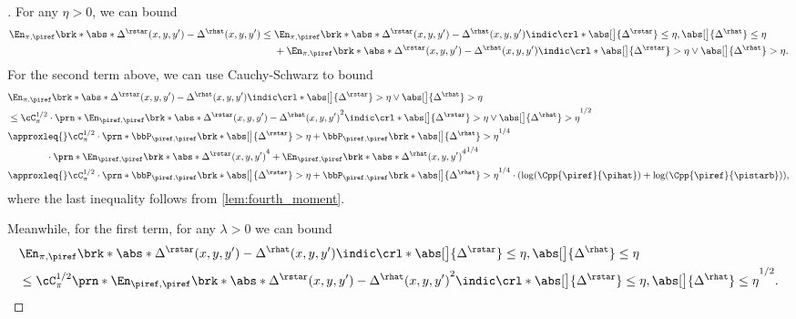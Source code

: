                \begin{proof}[]
          For any $\eta>0$, we can bound
          \begin{align}
            \En_{\pi,\piref}\brk*{\abs*{\Delta^{\rstar}(x,y,y') -
            \Delta^{\rhat}(x,y,y')}}
            &\leq{}             \En_{\pi,\piref}\brk*{\abs*{\Delta^{\rstar}(x,y,y') -
            \Delta^{\rhat}(x,y,y')}\indic\crl*{\abs[\big]{\Delta^{\rstar}}\leq\eta,
              \abs[\big]{\Delta^{\rhat}}\leq\eta}}\\
            &~~~~+  \En_{\pi,\piref}\brk*{\abs*{\Delta^{\rstar}(x,y,y') -
            \Delta^{\rhat}(x,y,y')}\indic\crl*{\abs[\big]{\Delta^{\rstar}}>\eta
                                \vee \abs[\big]{\Delta^{\rhat}}>\eta}}.
          \end{align}
          For the second term above, we can use Cauchy-Schwarz to bound
          \begin{align}
            &\En_{\pi,\piref}\brk*{\abs*{\Delta^{\rstar}(x,y,y') -
            \Delta^{\rhat}(x,y,y')}\indic\crl*{\abs[\big]{\Delta^{\rstar}}>\eta
              \vee \abs[\big]{\Delta^{\rhat}}>\eta}}\\
            &\leq{}\cC_{\pi}^{1/2}\cdot\prn*{\En_{\piref,\piref}\brk*{\abs*{\Delta^{\rstar}(x,y,y') -
            \Delta^{\rhat}(x,y,y')}^2\indic\crl*{\abs[\big]{\Delta^{\rstar}}>\eta
              \vee \abs[\big]{\Delta^{\rhat}}>\eta}}}^{1/2}\\
&\approxleq{}
              \cC_{\pi}^{1/2}\cdot\prn*{\bbP_{\piref,\piref}\brk*{\abs[\big]{\Delta^{\rstar}}>\eta}
              +
              \bbP_{\piref,\piref}\brk*{\abs[\big]{\Delta^{\rhat}}>\eta}}^{1/4}\\
            &\qquad\qquad\cdot{}\prn*{
              \En_{\piref,\piref}\brk*{\abs*{\Delta^{\rstar}(x,y,y')}^{4}}
              +               \En_{\piref,\piref}\brk*{\abs*{\Delta^{\rhat}(x,y,y')}^{4}}
                                                        }^{1/4}\\
            &\approxleq{}
              \cC_{\pi}^{1/2}\cdot\prn*{\bbP_{\piref,\piref}\brk*{\abs[\big]{\Delta^{\rstar}}>\eta}
              +
              \bbP_{\piref,\piref}\brk*{\abs[\big]{\Delta^{\rhat}}>\eta}}^{1/4}
              \cdot{}(\log(\Cpp{\piref}{\pihat})+\log(\Cpp{\piref}{\pistarb})),
          \end{align}
          where the last inequality follows from \cref{lem:fourth_moment}.

            Meanwhile, for the first term, for any $\lambda>0$ we can
            bound
            \begin{align}
              &\En_{\pi,\piref}\brk*{\abs*{\Delta^{\rstar}(x,y,y') -
                \Delta^{\rhat}(x,y,y')}\indic\crl*{\abs[\big]{\Delta^{\rstar}}\leq\eta,
                \abs[\big]{\Delta^{\rhat}}\leq\eta}}\\
              &\leq{}\cC_{\pi}^{1/2}\prn*{\En_{\piref,\piref}\brk*{\abs*{\Delta^{\rstar}(x,y,y') -
                \Delta^{\rhat}(x,y,y')}^2\indic\crl*{\abs[\big]{\Delta^{\rstar}}\leq\eta,
                \abs[\big]{\Delta^{\rhat}}\leq\eta}}}^{1/2}.
            \end{align}


\end{proof}
